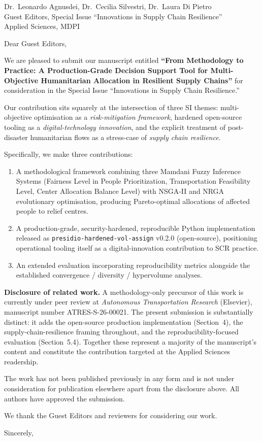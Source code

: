 \documentclass[11pt]{letter}
\begin{document}
\begin{letter}{Dr.\ Leonardo Agnusdei, Dr.\ Cecilia Silvestri, Dr.\ Laura Di Pietro \\
Guest Editors, Special Issue ``Innovations in Supply Chain Resilience'' \\
Applied Sciences, MDPI}

\opening{Dear Guest Editors,}

We are pleased to submit our manuscript entitled \textbf{``From Methodology to
Practice: A Production-Grade Decision Support Tool for Multi-Objective
Humanitarian Allocation in Resilient Supply Chains''} for consideration in
the Special Issue ``Innovations in Supply Chain Resilience.''

Our contribution sits squarely at the intersection of three SI themes:
multi-objective optimisation as a \emph{risk-mitigation framework}, hardened
open-source tooling as a \emph{digital-technology innovation}, and the
explicit treatment of post-disaster humanitarian flows as a stress-case of
\emph{supply chain resilience}.

Specifically, we make three contributions:
\begin{enumerate}
  \item A methodological framework combining three Mamdani Fuzzy Inference
        Systems (Fairness Level in People Prioritization, Transportation
        Feasibility Level, Center Allocation Balance Level) with NSGA-II and
        NRGA evolutionary optimisation, producing Pareto-optimal allocations
        of affected people to relief centres.
  \item A production-grade, security-hardened, reproducible Python
        implementation released as \texttt{presidio-hardened-vol-assign}
        v0.2.0 (open-source), positioning operational tooling itself as a
        digital-innovation contribution to SCR practice.
  \item An extended evaluation incorporating reproducibility metrics
        alongside the established convergence / diversity / hypervolume
        analyses.
\end{enumerate}

\textbf{Disclosure of related work.} A methodology-only precursor of this
work is currently under peer review at \emph{Autonomous Transportation
Research} (Elsevier), manuscript number ATRES-S-26-00021. The present
submission is substantially distinct: it adds the open-source production
implementation (Section~4), the supply-chain-resilience framing throughout,
and the reproducibility-focused evaluation (Section~5.4). Together these
represent a majority of the manuscript's content and constitute the
contribution targeted at the Applied Sciences readership.

The work has not been published previously in any form and is not under
consideration for publication elsewhere apart from the disclosure above.
All authors have approved the submission.

We thank the Guest Editors and reviewers for considering our work.

\closing{Sincerely,}

\end{letter}
\end{document}
